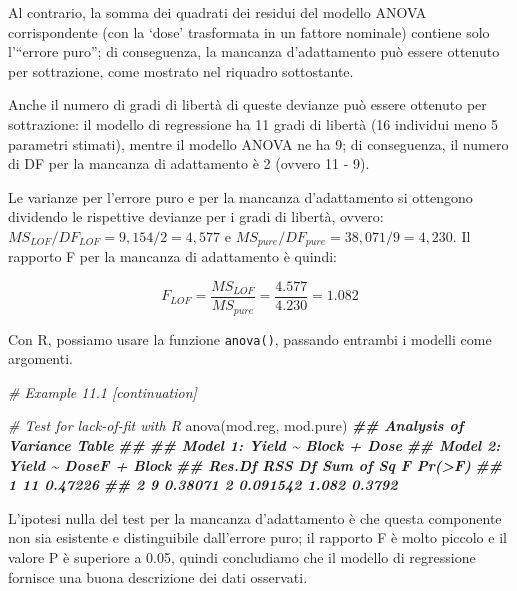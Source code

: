 \documentclass[
  12pt,
]{book}
\newenvironment{Shaded}{\begin{snugshade}}{\end{snugshade}}
\newcommand{\CommentTok}[1]{\textcolor[rgb]{0.56,0.35,0.01}{\textit{#1}}}
\newcommand{\DocumentationTok}[1]{\textcolor[rgb]{0.56,0.35,0.01}{\textbf{\textit{#1}}}}
\newcommand{\FunctionTok}[1]{\textcolor[rgb]{0.00,0.00,0.00}{#1}}
\newcommand{\NormalTok}[1]{#1}
\begin{document}
Al contrario, la somma dei quadrati dei residui del modello ANOVA corrispondente (con la `dose' trasformata in un fattore nominale) contiene solo l'``errore puro''; di conseguenza, la mancanza d'adattamento può essere ottenuto per sottrazione, come mostrato nel riquadro sottostante.

Anche il numero di gradi di libertà di queste devianze può essere ottenuto per sottrazione: il modello di regressione ha 11 gradi di libertà (16 individui meno 5 parametri stimati), mentre il modello ANOVA ne ha 9; di conseguenza, il numero di DF per la mancanza di adattamento è 2 (ovvero 11 - 9).

Le varianze per l'errore puro e per la mancanza d'adattamento si ottengono dividendo le rispettive devianze per i gradi di libertà, ovvero: \(MS_{LOF}/DF_{LOF} = 9,154/2 = 4,577\) e \(MS_{pure}/DF_{pure} = 38,071/9 = 4,230\). Il rapporto F per la mancanza di adattamento è quindi:

\begin{equation}
F_{LOF} = \frac{ MS_{LOF} } {MS_{pure}} = \frac{4.577}{4.230} = 1.082
\label{eq:eq102}
\end{equation}

Con R, possiamo usare la funzione \texttt{anova()}, passando entrambi i modelli come argomenti.

\small
\vspace{12pt}

\begin{Shaded}
\begin{Highlighting}[]
\CommentTok{\# Example 11.1 [continuation]}

\CommentTok{\# Test for lack{-}of{-}fit with R}
\FunctionTok{anova}\NormalTok{(mod.reg, mod.pure)}
\DocumentationTok{\#\# Analysis of Variance Table}
\DocumentationTok{\#\# }
\DocumentationTok{\#\# Model 1: Yield \textasciitilde{} Block + Dose}
\DocumentationTok{\#\# Model 2: Yield \textasciitilde{} DoseF + Block}
\DocumentationTok{\#\#   Res.Df     RSS Df Sum of Sq     F Pr(\textgreater{}F)}
\DocumentationTok{\#\# 1     11 0.47226                          }
\DocumentationTok{\#\# 2      9 0.38071  2  0.091542 1.082 0.3792}
\end{Highlighting}
\end{Shaded}

\normalsize

L'ipotesi nulla del test per la mancanza d'adattamento è che questa componente non sia esistente e distinguibile dall'errore puro; il rapporto F è molto piccolo e il valore P è superiore a 0.05, quindi concludiamo che il modello di regressione fornisce una buona descrizione dei dati osservati.
\end{document}

